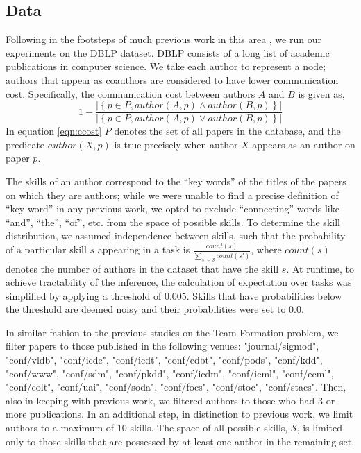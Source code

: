\subsection{Data}

Following in the footsteps of much previous work in this area \cite{lappas2009finding, kargar2011discovering, bhowmik2014submodularity}, we run our experiments on the DBLP dataset.
DBLP consists of a long list of academic publications in computer science.
We take each author to represent a node; authors that appear as coauthors are considered to have lower communication cost.
Specifically, the communication cost between authors $ A $ and $ B $ is given as,
\begin{equation}\label{eqn:ccost}
1 - \frac{| \left\{ p \in P, author(A, p) \land author(B, p) \right\} |}{| \left\{ p \in P, author(A, p) \lor author(B, p) \right\} |}
\end{equation}
In equation \ref{eqn:ccost} $ P $ denotes the set of all papers in the database, and the predicate $ author(X, p) $ is true precisely when author $ X $ appears as an author on paper $ p $.

The skills of an author correspond to the ``key words'' of the titles of the papers on which they are authors; while we were unable to find a precise definition of ``key word'' in any previous work, we opted to exclude ``connecting'' words like ``and'', ``the'', ``of'', etc. from the space of possible skills.
To determine the skill distribution, we assumed independence between skills, such that the probability of a particular skill $ s $ appearing in a task is $ \frac{count(s)}{\sum_{s' \in \mathcal{S}} count(s')} $, where $count(s)$ denotes the number of authors in the dataset that have the skill $s$.
At runtime, to achieve tractability of the inference, the calculation of expectation over tasks was simplified by applying a threshold of $0.005$. Skills that have probabilities below the threshold are deemed noisy and their probabilities were set to $0.0$.

In similar fashion to the previous studies on the Team Formation problem, we filter papers to those published in the following venues: "journal/sigmod", "conf/vldb", "conf/icde", "conf/icdt", "conf/edbt", "conf/pods", "conf/kdd", "conf/www", "conf/sdm", "conf/pkdd", "conf/icdm", "conf/icml", "conf/ecml", "conf/colt", "conf/uai", "conf/soda", "conf/focs", "conf/stoc", "conf/stacs".
Then, also in keeping with previous work, we filtered authors to those who had 3 or more publications.
In an additional step, in distinction to previous work, we limit authors to a maximum of 10 skills.
The space of all possible skills, $ \mathcal{S} $, is limited only to those skills that are possessed by at least one author in the remaining set.

